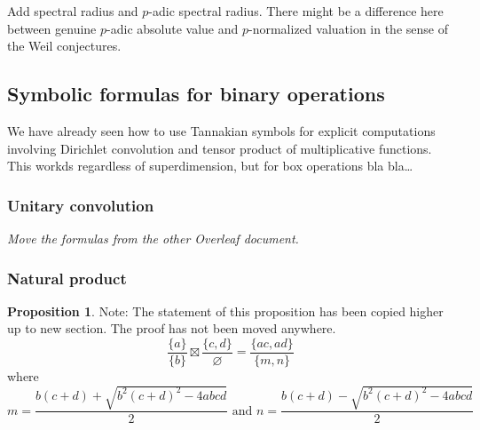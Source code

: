 \documentclass[a4paper]{article}
\theoremstyle{definition}
\newtheorem{proposition}[theorem]{Proposition}
\theoremstyle{remark}
\begin{document}

Add spectral radius and $p$-adic spectral radius. There might be a difference here between genuine $p$-adic absolute value and $p$-normalized valuation in the sense of the Weil conjectures.

\subsection{Symbolic formulas for binary operations}

We have already seen how to use Tannakian symbols for explicit computations involving Dirichlet convolution and tensor product of multiplicative functions. This workds regardless of superdimension, but for box operations bla bla\ldots


\subsubsection{Unitary convolution}


\emph{Move the formulas from the other Overleaf document.}


\subsubsection{Natural product}



\begin{proposition}
Note: The statement of this proposition has been copied higher up to new section. The proof has not been moved anywhere.
$$\frac{\{a\}}{\{b\}} \boxtimes \frac{\{c,d\}}{\varnothing} = \frac{\{ac,ad\}}{\{m, n\}}$$
where 
$$m = \frac{b(c+d) + \sqrt{b^2 (c+d)^2 - 4abcd}}{2} \text{\ and\ } n = \frac{b(c+d) - \sqrt{b^2 (c+d)^2 - 4abcd}}{2}$$
\end{proposition}
\end{document}
